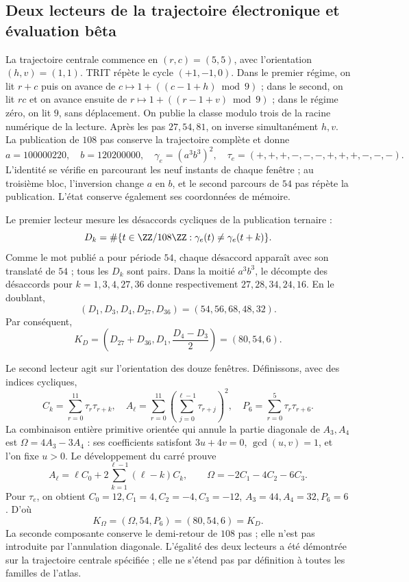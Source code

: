 \subsection{Deux lecteurs de la trajectoire électronique et évaluation bêta}
\label{vi:vi:dep:beta}

La trajectoire centrale commence en \((r,c)=(5,5)\), avec
l'orientation \((h,v)=(1,1)\). TRIT répète le cycle \((+1,-1,0)\).
Dans le premier régime, on lit \(r+c\) puis on avance de
\(c\mapsto1+((c-1+h)\bmod9)\) ; dans le second, on lit \(rc\) et
on avance ensuite de \(r\mapsto1+((r-1+v)\bmod9)\) ; dans le régime
zéro, on lit \(9\), sans déplacement. On publie la classe modulo
trois de la racine numérique de la lecture. Après les pas \(27,54,81\),
on inverse simultanément \(h,v\). La publication de \(108\)
pas conserve la trajectoire complète et donne
\begin{equation}
 a=100000220,\quad b=120200000,\quad
 \gamma_e=(a^3b^3)^2,
 \quad\tau_e=(+,+,+,-,-,-,+,+,+,-,-,-).
 \label{vi:vi:dep:trayectoria-electron}
\end{equation}
L'identité se vérifie en parcourant les neuf instants de chaque
fenêtre ; au troisième bloc, l'inversion change \(a\) en \(b\),
et le second parcours de \(54\) pas répète la publication.
L'état conserve également ses coordonnées de mémoire.

Le premier lecteur mesure les désaccords cycliques de la publication ternaire :
\[
 D_k=\#\{t\in\ZZ/108\ZZ:\gamma_e(t)\ne\gamma_e(t+k)\}.
\]
Comme le mot publié a pour période \(54\), chaque désaccord
apparaît avec son translaté de \(54\) ; tous les \(D_k\) sont pairs.
Dans la moitié \(a^3b^3\), le décompte des désaccords pour
\(k=1,3,4,27,36\) donne respectivement \(27,28,34,24,16\).
En le doublant,
\[
 (D_1,D_3,D_4,D_{27},D_{36})=(54,56,68,48,32).
\]
Par conséquent,
\begin{equation}
 K_D=\left(D_{27}+D_{36},D_1,\frac{D_4-D_3}{2}\right)
     =(80,54,6).
 \label{vi:vi:dep:KD}
\end{equation}

Le second lecteur agit sur l’orientation des douze fenêtres.
Définissons, avec des indices cycliques,
\[
 C_k=\sum_{r=0}^{11}\tau_r\tau_{r+k},\quad
 A_\ell=\sum_{r=0}^{11}\left(\sum_{j=0}^{\ell-1}\tau_{r+j}\right)^2,
 \quad P_6=\sum_{r=0}^{5}\tau_r\tau_{r+6}.
\]
La combinaison entière primitive orientée qui annule la partie diagonale
de \(A_3,A_4\) est \(\Omega=4A_3-3A_4\) : ses coefficients
satisfont \(3u+4v=0\), \(\gcd(u,v)=1\), et l’on fixe \(u>0\).
Le développement du carré prouve
\[
 A_\ell=\ell C_0+
     2\sum_{k=1}^{\ell-1}(\ell-k)C_k,
 \qquad\Omega=-2C_1-4C_2-6C_3.
\]
Pour \(\tau_e\), on obtient
\(C_0=12,C_1=4,C_2=-4,C_3=-12\),
\(A_3=44,A_4=32,P_6=6\). D’où
\begin{equation}
 K_\Omega=(\Omega,54,P_6)=(80,54,6)=K_D.
 \label{vi:vi:dep:KOmega}
\end{equation}
La seconde composante conserve le demi-retour de \(108\) pas ;
elle n'est pas introduite par l'annulation diagonale. L'égalité des deux
lecteurs a été démontrée sur la trajectoire centrale spécifiée ;
elle ne s'étend pas par définition à toutes les familles de l'atlas.

